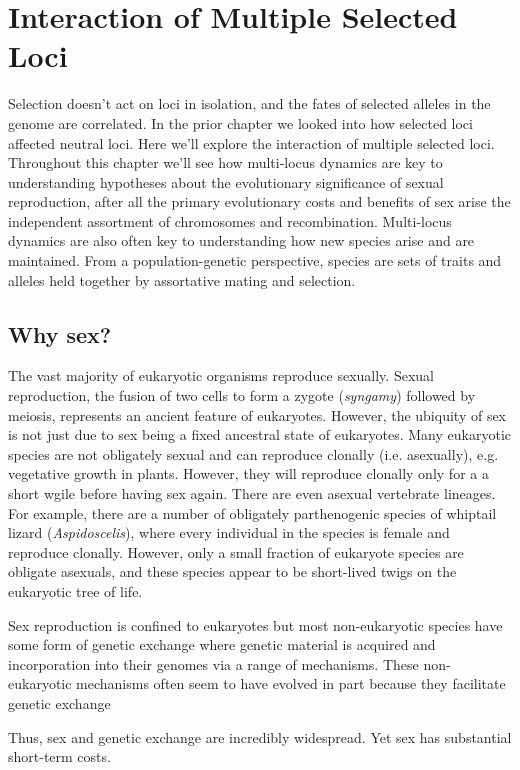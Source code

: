 \chapter{Interaction of Multiple Selected Loci}

Selection doesn't act on loci in isolation, and the fates of selected alleles in the genome are correlated. In the prior chapter we looked into how selected loci affected neutral loci. Here we'll explore the interaction of multiple selected loci. Throughout this chapter we'll see how multi-locus dynamics are key to understanding hypotheses about the evolutionary significance of sexual reproduction, after all the primary evolutionary costs and benefits of sex arise the independent assortment of chromosomes and recombination. Multi-locus dynamics are also often key to understanding how new species arise and are maintained. From a population-genetic perspective, species are sets of traits and alleles held together by assortative mating and selection.

\section{Why sex?}
The vast majority of eukaryotic organisms reproduce sexually. Sexual reproduction, the fusion of two cells to form a zygote  ({\it syngamy}) followed by meiosis, represents an ancient feature of eukaryotes. However, the ubiquity of sex is not just due to sex being a fixed ancestral state of eukaryotes. Many eukaryotic species are not obligately sexual and can reproduce clonally (i.e. asexually), e.g. vegetative growth in plants. However, they will reproduce clonally only for a a short wgile before having sex again. There are even asexual vertebrate lineages. For example, there are a number of obligately parthenogenic species of whiptail lizard ({\it Aspidoscelis}), where every individual in the species is female and reproduce clonally.  However, only a small fraction of  eukaryote species are obligate asexuals, and these species appear to be short-lived twigs on the eukaryotic tree of life. 

Sex reproduction is confined to eukaryotes but most non-eukaryotic species have some form of genetic exchange where genetic material is acquired and incorporation into their genomes via a range of mechanisms. These non-eukaryotic mechanisms often seem to have evolved in part because they facilitate genetic exchange 

Thus, sex and genetic exchange are incredibly widespread. Yet sex has substantial short-term costs. 

